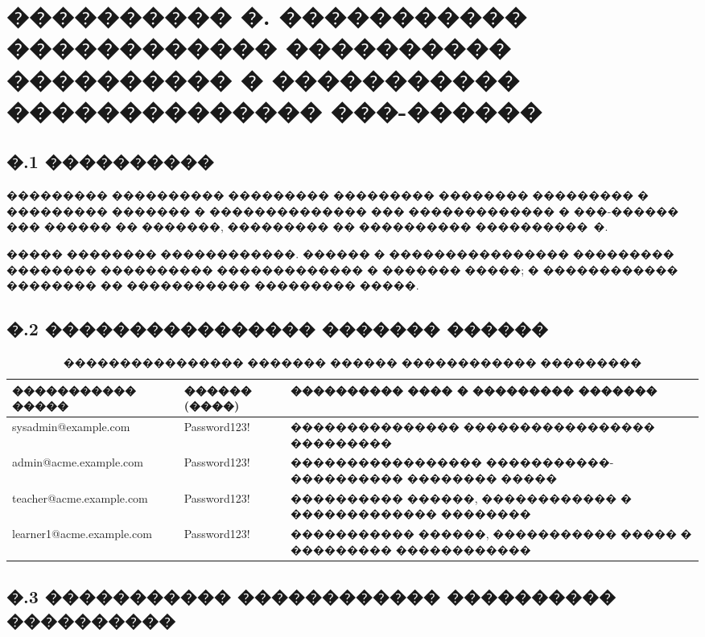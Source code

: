 \chapter{{\fontsize{14pt}{21pt}\selectfont\MakeUppercase{���������� �. ����������� ������������ ���������� ���������� � ����������� �������������� ���-������}}}
\label{app:user-admin}

\section*{�.1 ����������}

��������� ���������� ��������� ��������� �������� ��������� � ��������� ������� � �������������� ��� ������������� � ���-������ ��� ������ �� �������, ��������� �� ���������� ����������~�\cite{flutter_docs,react_docs,fastapi_docs}.

����� �������� ������������. ������ � ���������������� ��������� �������� ���������� ������������� � ������� �����; � ������������ �������� �� ����������� ��������� �����.

\section*{�.2 ���������������� ������� ������}

\begin{table}[H]
\centering
\caption{���������������� ������� ������ ������������ ���������}
\label{tab:appv-demo-users}
{\fontsize{10pt}{12pt}\selectfont
\begin{tabularx}{\textwidth}{|>{\RaggedRight\arraybackslash}p{54mm}|>{\RaggedRight\arraybackslash}p{27mm}|>{\RaggedRight\arraybackslash}X|}
\hline
����������� ����� & ������ (����) & ���������� ���� � ��������� ������� \\
\hline
sysadmin@example.com & Password123! & ��������������� ����������������� ��������� \\
\hline
admin@acme.example.com & Password123! & ����������������� �����������-���������� �������� ����� \\
\hline
teacher@acme.example.com & Password123! & ���������� ������, ������������ � ������������� �������� \\
\hline
learner1@acme.example.com & Password123! & ����������� ������, ����������� ����� � ��������� ������������ \\
\hline
\end{tabularx}
}
\end{table}

\section*{�.3 ����������� ������������ ���������� ����������}

